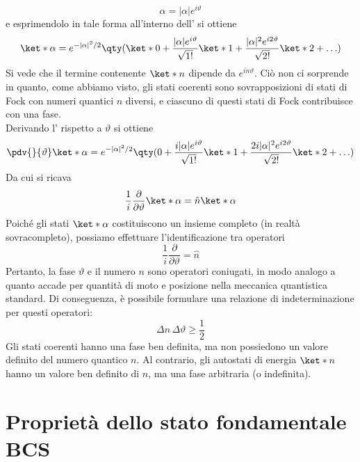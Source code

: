 \begin{equation*}
   \alpha = |\alpha| e^{i\vartheta}
\end{equation*}
e esprimendolo in tale forma all'interno dell' si ottiene
\begin{equation}
   \ket*{\alpha}
   = e^{-|\alpha|^2/2} 
   \qty( \ket*{0} + \frac{|\alpha| e^{i\vartheta}}{\sqrt{1!}} \ket*{1} + \frac{|\alpha|^2 e^{i2\vartheta}}{\sqrt{2!}} \ket*{2} + \ldots )
   \label{eq:coherent_state_polar_form}
\end{equation}
Si vede che il termine contenente $\ket*{n}$ dipende da $e^{in\vartheta}$. Ciò non ci sorprende in quanto, come abbiamo visto, gli stati coerenti sono sovrapposizioni di stati di Fock con numeri quantici $n$ diversi, e ciascuno di questi stati di Fock contribuisce con una fase.\\
Derivando l' rispetto a $\vartheta$ si ottiene
\begin{equation*}
   \pdv{}{\vartheta} \ket*{\alpha}
   = e^{-|\alpha|^2/2} \qty( 0 + \frac{i |\alpha| e^{i\vartheta}}{\sqrt{1!}} \ket*{1} + \frac{2i |\alpha|^2 e^{i2\vartheta}}{\sqrt{2!}} \ket*{2} + \ldots )
\end{equation*}
Da cui si ricava
\begin{equation*}
   \frac{1}{i}\frac{\partial}{\partial \vartheta} \ket*{\alpha} = \hat{n} \ket*{\alpha}
\end{equation*}
Poiché gli stati $\ket*{\alpha}$ costituiscono un insieme completo (in realtà sovracompleto), possiamo effettuare l'identificazione tra operatori
\begin{equation*}
   \frac{1}{i}\frac{\partial}{\partial \vartheta} = \hat{n}
\end{equation*}
Pertanto, la fase $\vartheta$ e il numero $n$ sono operatori coniugati, in modo analogo a quanto accade per quantità di moto e posizione nella meccanica quantistica standard. Di conseguenza, è possibile formulare una relazione di indeterminazione per questi operatori:
\begin{equation*}
   \Delta n \, \Delta \vartheta \geq \frac{1}{2}
\end{equation*}
Gli stati coerenti hanno una fase ben definita, ma non possiedono un valore definito del numero quantico $n$. Al contrario, gli autostati di energia $\ket*{n}$ hanno un valore ben definito di $n$, ma una fase arbitraria (o indefinita).
\section{Proprietà dello stato fondamentale BCS}
